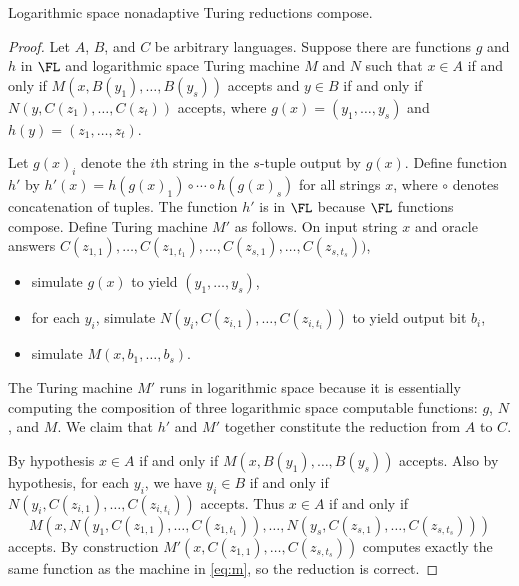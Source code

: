 \documentclass{article}
\begin{document}

%

\begin{lemma}\label{lem:compose}
  Logarithmic space nonadaptive Turing reductions compose.
\end{lemma}
\begin{proof}
  Let $A$, $B$, and $C$ be arbitrary languages.
  Suppose there are functions $g$ and $h$ in $\FL$ and logarithmic space Turing machine $M$ and $N$ such that $x \in A$ if and only if $M(x, B(y_1), \dotsc, B(y_s))$ accepts and $y \in B$ if and only if $N(y, C(z_1), \dotsc, C(z_t))$ accepts, where $g(x) = (y_1, \dotsc, y_s)$ and $h(y) = (z_1, \dotsc, z_t)$.

  Let $g(x)_i$ denote the $i$th string in the $s$-tuple output by $g(x)$.
  Define function $h'$ by $h'(x) = h(g(x)_1) \circ \dotsb \circ h(g(x)_s)$ for all strings $x$, where $\circ$ denotes concatenation of tuples.
  The function $h'$ is in $\FL$ because $\FL$ functions compose.
  Define Turing machine $M'$ as follows.
  On input string $x$ and oracle answers $C(z_{1, 1}), \dotsc, C(z_{1, t_1}), \dotsc, C(z_{s, 1}), \dotsc, C(z_{s, t_s}))$,
  \begin{itemize}
  \item simulate $g(x)$ to yield $(y_1, \dotsc, y_s)$,
  \item for each $y_i$, simulate $N(y_i, C(z_{i, 1}), \dotsc, C(z_{i, t_i}))$ to yield output bit $b_i$,
  \item simulate $M(x, b_1, \dotsc, b_s)$.
  \end{itemize}
  The Turing machine $M'$ runs in logarithmic space because it is essentially computing the composition of three logarithmic space computable functions: $g$, $N$, and $M$.
  We claim that $h'$ and $M'$ together constitute the reduction from $A$ to $C$.

  By hypothesis $x \in A$ if and only if $M(x, B(y_1), \dotsc, B(y_s))$ accepts.
  Also by hypothesis, for each $y_i$, we have $y_i \in B$ if and only if $N(y_i, C(z_{i, 1}), \dotsc, C(z_{i, t_i}))$ accepts.
  Thus $x \in A$ if and only if
  \begin{equation}\label{eq:m}
    M(x, N(y_1, C(z_{1, 1}), \dotsc, C(z_{1, t_1})), \dotsc, N(y_s, C(z_{s, 1}), \dotsc, C(z_{s, t_s})))
  \end{equation}
  accepts.
  By construction $M'(x, C(z_{1, 1}), \dotsc, C(z_{s, t_s}))$ computes exactly the same function as the machine in \eqref{eq:m}, so the reduction is correct.
\end{proof}
\end{document}
